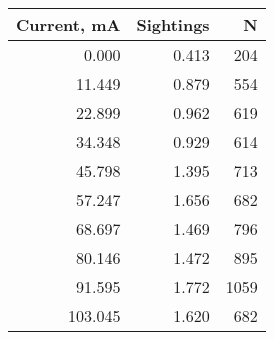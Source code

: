 \begin{tabular}{rrr}
\toprule
 Current, mA &  Sightings &    N \\
\midrule
       0.000 &      0.413 &  204 \\
      11.449 &      0.879 &  554 \\
      22.899 &      0.962 &  619 \\
      34.348 &      0.929 &  614 \\
      45.798 &      1.395 &  713 \\
      57.247 &      1.656 &  682 \\
      68.697 &      1.469 &  796 \\
      80.146 &      1.472 &  895 \\
      91.595 &      1.772 & 1059 \\
     103.045 &      1.620 &  682 \\
\bottomrule
\end{tabular}
